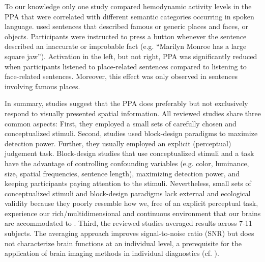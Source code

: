\documentclass[english]{article}
\begin{document}
To our knowledge only one study \citep{aziz2008modulation} compared hemodynamic
activity levels in the PPA that were correlated with different semantic
categories occurring in spoken language.
\cite{aziz2008modulation} used sentences that described famous or generic places
and faces, or objects.
Participants were instructed to press a button whenever the sentence described
an inaccurate or improbable fact (e.g. ``Marilyn Monroe has a large square
jaw'').
Activation in the left, but not right, PPA was significantly reduced when
participants listened to place-related sentences compared to listening to
face-related sentences. Moreover, this effect was only observed in sentences
involving famous places.

In summary, studies suggest that the PPA does preferably but not exclusively
respond to visually presented spatial information.
All reviewed studies share three common aspects:
First, they employed a small sets of carefully chosen and conceptualized
stimuli.
Second, studies used block-design paradigms to maximize detection power.
Further, they usually employed an explicit (perceptual) judgement task.
Block-design studies that use conceptualized stimuli and a task have the
advantage of controlling confounding variables (e.g. color, luminance, size,
spatial frequencies, sentence length), maximizing detection power, and keeping
participants paying attention to the stimuli.
Nevertheless, small sets of conceptualized stimuli and block-design paradigms
lack external and ecological validity \citep{westfall2016fixing,
hasson2004intersubject} because they poorly resemble how we, free of an
explicit perceptual task, experience our rich/multidimensional and continuous
environment that our brains are accommodated to
\citep{sonkusare2019naturalistic}.
Third, the reviewed studies averaged results across 7-11 subjects.
The averaging approach improves signal-to-noise ratio (SNR) but does not
characterize brain functions at an individual level, a prerequisite for the
application of brain imaging methods in individual diagnostics (cf.
\cite{dubois2016building, eickhoff2020towards}).
\end{document}
